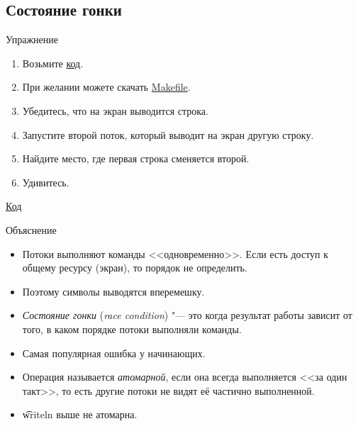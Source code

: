\subsection{Состояние гонки}

\begin{frame}
\end{frame}

\begin{frame}{Упражнение}
	\begin{enumerate}
		\item Возьмите \href{https://github.com/yeputons/fall-2017-paradigms/raw/master/171023/sources/03-writeln-single.cpp}{код}.
		\item При желании можете скачать \href{https://github.com/yeputons/fall-2017-paradigms/raw/master/171023/sources/Makefile}{Makefile}.
		\item Убедитесь, что на экран выводится строка.
		\item Запустите второй поток, который выводит на экран другую строку.
		\item Найдите место, где первая строка сменяется второй.
		\item Удивитесь.
	\end{enumerate}
	\href{https://github.com/yeputons/fall-2017-paradigms/raw/master/171023/sources/04-writeln-race.cpp}{Код}
\end{frame}

\begin{frame}{Объяснение}
	\begin{itemize}
		\item
			Потоки выполняют команды <<одновременно>>.
			Если есть доступ к общему ресурсу (экран), то порядок не определить.
		\item
			Поэтому символы выводятся вперемешку.
		\item
			\textit{Состояние гонки} (\textit{race condition}) "--- это когда результат работы зависит от того, в каком порядке потоки выполняли команды.
		\item
			Самая популярная ошибка у начинающих.
		\item
			Операция называется \textit{атомарной}, если она всегда выполняется <<за один такт>>,
			то есть другие потоки не видят её частично выполненной.
		\item
			\t{writeln} выше не атомарна.
	\end{itemize}
\end{frame}

